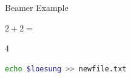 \documentclass{beamer}
\begin{document}
\begin{frame}[fragile]{Beamer Example}
    \begin{aufgabe}
        $2+2=$
    \end{aufgabe}
    \begin{loesung}
        4
    \end{loesung}

\begin{lstlisting}[language=bash]
  echo $loesung >> newfile.txt
\end{lstlisting}
\end{frame}
\end{document}
